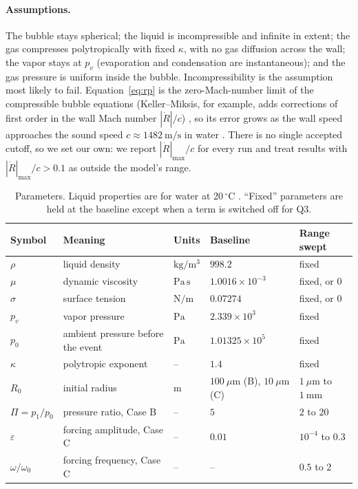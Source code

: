 \paragraph{Assumptions.} The bubble stays spherical; the liquid is incompressible and
infinite in extent; the gas compresses polytropically with fixed $\kappa$, with no gas
diffusion across the wall; the vapor stays at $p_v$ (evaporation and condensation are
instantaneous); and the gas pressure is uniform inside the bubble. Incompressibility is the
assumption most likely to fail. Equation~\eqref{eq:rp} is the zero-Mach-number limit of the
compressible bubble equations (Keller--Miksis, for example, adds corrections of first order
in the wall Mach number $|\dot R|/c$) \cite{lauterborn2010}, so its error grows as the wall
speed approaches the sound speed $c \approx 1482\ \mathrm{m/s}$ in water \cite{nistwebbook}.
There is no single accepted cutoff, so we set our own: we report $|\dot R|_{\max}/c$ for every
run and treat results with $|\dot R|_{\max}/c > 0.1$ as outside the model's range.

\begin{table}[t]
\centering
\caption{Parameters. Liquid properties are for water at 20\,$^\circ$C
\cite{nistwebbook}. ``Fixed'' parameters are held at the baseline except when a term is
switched off for Q3.}
\label{tab:params}
\begin{tabular}{@{}lllll@{}}
\toprule
Symbol & Meaning & Units & Baseline & Range swept \\
\midrule
$\rho$ & liquid density & $\mathrm{kg/m^3}$ & $998.2$ & fixed \\
$\mu$ & dynamic viscosity & $\mathrm{Pa\,s}$ & $1.0016\times10^{-3}$ & fixed, or $0$ \\
$\sigma$ & surface tension & $\mathrm{N/m}$ & $0.07274$ & fixed, or $0$ \\
$p_v$ & vapor pressure & $\mathrm{Pa}$ & $2.339\times10^{3}$ & fixed \\
$p_0$ & ambient pressure before the event & $\mathrm{Pa}$ & $1.01325\times10^{5}$ & fixed \\
$\kappa$ & polytropic exponent & -- & $1.4$ & fixed \\
$R_0$ & initial radius & $\mathrm{m}$ & $100\ \mu\mathrm{m}$ (B), $10\ \mu\mathrm{m}$ (C) & $1\ \mu\mathrm{m}$ to $1\ \mathrm{mm}$ \\
$\Pi = p_1/p_0$ & pressure ratio, Case B & -- & $5$ & $2$ to $20$ \\
$\varepsilon$ & forcing amplitude, Case C & -- & $0.01$ & $10^{-4}$ to $0.3$ \\
$\omega/\omega_0$ & forcing frequency, Case C & -- & -- & $0.5$ to $2$ \\
\bottomrule
\end{tabular}
\end{table}

